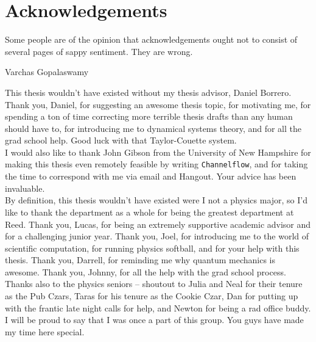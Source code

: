     \chapter*{Acknowledgements}
	\epigraph{Some people are of the opinion that acknowledgements ought not to consist of several pages of sappy sentiment. They are wrong.}{Varchas Gopalaswamy}

This thesis wouldn't have existed without my thesis advisor, Daniel Borrero. Thank you, Daniel, for suggesting an awesome thesis topic, for motivating me, for spending a ton of time correcting more terrible thesis drafts than any human should have to, for introducing me to dynamical systems theory, and for all the grad school help. Good luck with that Taylor-Couette system.\\

I would also like to thank John Gibson from the University of New Hampshire for making this thesis even remotely feasible by writing {\tt Channelflow}, and for taking the time to correspond with me via email and Hangout. Your advice has been invaluable. \\
 
By definition, this thesis wouldn't have existed were I not a physics major, so I'd like to thank the department as a whole for being the greatest department at Reed. Thank you, Lucas, for being an extremely supportive academic advisor and for a  challenging junior year. Thank you, Joel, for introducing me to the world of scientific computation, for running physics softball, and for your help with this thesis. Thank you, Darrell, for reminding me why quantum mechanics is awesome. Thank you, Johnny, for all the help with the grad school process. Thanks also to the physics seniors -- shoutout to Julia and Neal for their tenure as the Pub Czars, Taras for his tenure as the Cookie Czar, Dan for putting up with the frantic late night calls for help, and Newton for being a rad office buddy.  I will be proud to say that I was once a part of this group. You guys have made my time here special. \\



